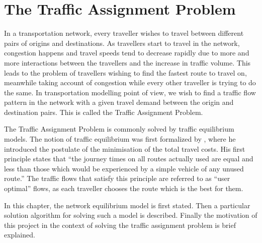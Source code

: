 \chapter{The Traffic Assignment Problem} \label{chap:ta}

In a transportation network,
every traveller wishes to travel between different pairs of origins and destinations.
As travellers start to travel in the network,
congestion happens and travel speeds tend to decrease rapidly due to more and more interactions between the travellers and the increase in traffic volume.
This leads to the problem of travellers wishing to find the fastest route to travel on,
meanwhile taking account of congestion while every other traveller is trying to do the same.
In transportation modelling point of view,
we wish to find a traffic flow pattern in the network with a given travel demand between the origin and destination pairs. 
This is called the Traffic Assignment Problem.

The Traffic Assignment Problem is commonly solved by traffic equilibrium models.
The notion of traffic equilibrium was first formalized by \cite{Wardrop},
where he introduced the postulate of the minimisation of the total travel costs.
His first principle states that ``the journey times on all routes actually used are equal and less than those which would be experienced by a simple vehicle of any unused route.''
The traffic flows that satisfy this principle are referred to as ``user optimal'' flows,
as each traveller chooses the route which is the best for them.

In this chapter,
the network equilibrium model is first stated.
Then a particular solution algorithm for solving such a model is described.
Finally the motivation of this project in the context of solving the traffic assignment problem is brief explained.

